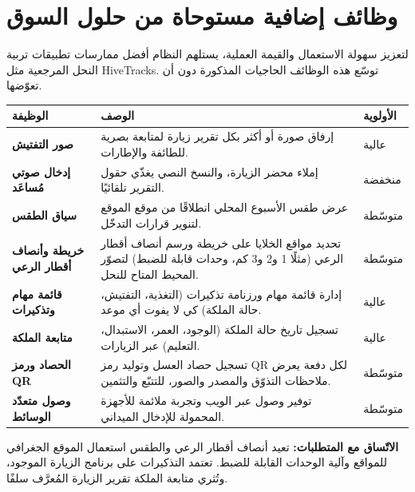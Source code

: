 \section{وظائف إضافية مستوحاة من حلول السوق}
لتعزيز سهولة الاستعمال والقيمة العملية، يستلهم النظام أفضل ممارسات تطبيقات تربية
النحل المرجعية مثل \textenglish{HiveTracks}. توسّع هذه الوظائف الحاجيات المذكورة
دون أن تعوّضها.
\begin{xltabular}{\textwidth}{>{\bfseries}p{4.2cm} X C{2.1cm}}
\toprule
\textbf{الوظيفة} & \textbf{الوصف} & \textbf{الأولوية} \\
\midrule
\endhead
صور التفتيش & إرفاق صورة أو أكثر بكل تقرير زيارة لمتابعة بصرية للطائفة والإطارات. & عالية \\
إدخال صوتي مُساعَد & إملاء محضر الزيارة، والنسخ النصي يغذّي حقول التقرير تلقائيًا. & منخفضة \\
سياق الطقس & عرض طقس الأسبوع المحلي انطلاقًا من موقع الموقع لتنوير قرارات التدخّل. & متوسّطة \\
خريطة وأنصاف أقطار الرعي & تحديد مواقع الخلايا على خريطة ورسم أنصاف أقطار الرعي (مثلًا 1 و2 و3 كم، وحدات قابلة للضبط) لتصوّر المحيط المتاح للنحل. & متوسّطة \\
قائمة مهام وتذكيرات & إدارة قائمة مهام ورزنامة تذكيرات (التغذية، التفتيش، حالة الملكة) كي لا يفوت أي موعد. & عالية \\
متابعة الملكة & تسجيل تاريخ حالة الملكة (الوجود، العمر، الاستبدال، التعليم) عبر الزيارات. & عالية \\
الحصاد ورمز QR & تسجيل حصاد العسل وتوليد رمز QR لكل دفعة يعرض ملاحظات التذوّق والمصدر والصور، للتتبّع والتثمين. & متوسّطة \\
وصول متعدّد الوسائط & توفير وصول عبر الويب وتجربة ملائمة للأجهزة المحمولة للإدخال الميداني. & متوسّطة \\
\bottomrule
\end{xltabular}
\begin{encadre}
\textbf{الاتّساق مع المتطلبات:} تعيد أنصاف أقطار الرعي والطقس استعمال الموقع
الجغرافي للمواقع وآلية الوحدات القابلة للضبط. تعتمد التذكيرات على برنامج الزيارة
الموجود، وتُثري متابعة الملكة تقرير الزيارة المُعرَّف سلفًا.
\end{encadre}

